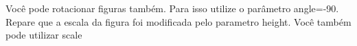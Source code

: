 \documentclass[	DIV=calc,%
							paper=a4,%
							fontsize=12pt,%
							onecolumn]{scrartcl}	 					%
\begin{document}
Você pode rotacionar figuras também. Para isso utilize o parâmetro angle=-90. Repare que a escala da figura foi modificada pelo parametro height. Você também pode utilizar scale





\end{document}
